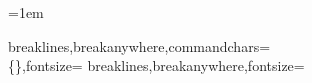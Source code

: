 \usepackage{lmodern}
\usepackage{tikz}
\usetikzlibrary{arrows.meta}
\usepackage{booktabs}

\setlength{\parindent}{1em}
\setlength{\parskip}{0pt}

%
%
\pagestyle{plain}

\emergencystretch=1em

%
%
\raggedbottom

%
\renewcommand{\topfraction}{0.9}
\renewcommand{\bottomfraction}{0.9}
\renewcommand{\textfraction}{0.06}
\renewcommand{\floatpagefraction}{0.75}

%
%
\usepackage{fvextra}
%
  {breaklines,breakanywhere,commandchars=\\\{\},fontsize=\small}
%
  {breaklines,breakanywhere,fontsize=\small}

